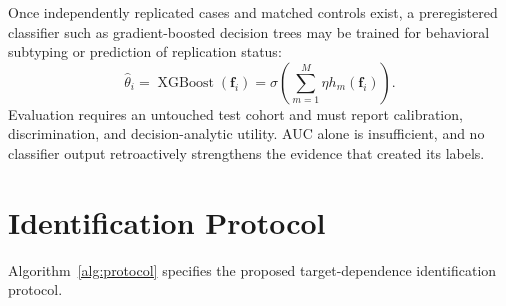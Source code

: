 \documentclass[11pt,letterpaper]{article}
\begin{document}
Once independently replicated cases and matched controls exist, a preregistered classifier such as gradient-boosted decision trees may be trained for behavioral subtyping or prediction of replication status:
\begin{equation}
\hat{\theta}_i = \operatorname{XGBoost}(\mathbf{f}_i)
=\sigma\!\left(\sum_{m=1}^{M}\eta h_m(\mathbf{f}_i)\right).
\end{equation}
Evaluation requires an untouched test cohort and must report calibration, discrimination, and decision-analytic utility. AUC alone is insufficient, and no classifier output retroactively strengthens the evidence that created its labels.

\section{Identification Protocol}

Algorithm~\ref{alg:protocol} specifies the proposed target-dependence identification protocol.
\end{document}
